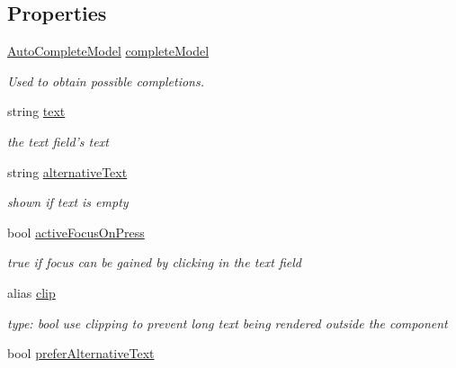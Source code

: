 \subsection*{Properties}
\begin{DoxyCompactItemize}
\item 
\hypertarget{classAutoCompleteTextField_a633ed88c3f0b7217561c4dbd0c4ea021}{\hyperlink{classAutoCompleteModel}{Auto\-Complete\-Model} \hyperlink{classAutoCompleteTextField_a633ed88c3f0b7217561c4dbd0c4ea021}{complete\-Model}}\label{classAutoCompleteTextField_a633ed88c3f0b7217561c4dbd0c4ea021}

\begin{DoxyCompactList}\small\item\em Used to obtain possible completions. \end{DoxyCompactList}\item 
\hypertarget{classAutoCompleteTextField_a969420d165123d0897e14887bde2a988}{string \hyperlink{classAutoCompleteTextField_a969420d165123d0897e14887bde2a988}{text}}\label{classAutoCompleteTextField_a969420d165123d0897e14887bde2a988}

\begin{DoxyCompactList}\small\item\em the text field's text \end{DoxyCompactList}\item 
\hypertarget{classAutoCompleteTextField_ae017eba891574653d44853c70c5f288e}{string \hyperlink{classAutoCompleteTextField_ae017eba891574653d44853c70c5f288e}{alternative\-Text}}\label{classAutoCompleteTextField_ae017eba891574653d44853c70c5f288e}

\begin{DoxyCompactList}\small\item\em shown if text is empty \end{DoxyCompactList}\item 
\hypertarget{classAutoCompleteTextField_aac0b683369ed7794810c7466149bea9f}{bool \hyperlink{classAutoCompleteTextField_aac0b683369ed7794810c7466149bea9f}{active\-Focus\-On\-Press}}\label{classAutoCompleteTextField_aac0b683369ed7794810c7466149bea9f}

\begin{DoxyCompactList}\small\item\em {\ttfamily true} if focus can be gained by clicking in the text field \end{DoxyCompactList}\item 
\hypertarget{classAutoCompleteTextField_a4b4a8370abd9f2c421de9e0316807ee8}{alias \hyperlink{classAutoCompleteTextField_a4b4a8370abd9f2c421de9e0316807ee8}{clip}}\label{classAutoCompleteTextField_a4b4a8370abd9f2c421de9e0316807ee8}

\begin{DoxyCompactList}\small\item\em type\-: bool use clipping to prevent long text being rendered outside the component \end{DoxyCompactList}\item 
bool \hyperlink{classAutoCompleteTextField_a710dfeff1a9fca62d3103dff06e06afb}{prefer\-Alternative\-Text}
\end{DoxyCompactItemize}


